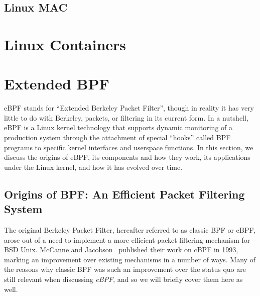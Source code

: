 \subsection{Linux MAC}%
\label{ss:linux-mac-bg}




\section{Linux Containers}%
\label{s:containers-bg}




\section{Extended BPF}%
\label{s:ebpf-bg}

eBPF stands for \enquote{Extended Berkeley Packet Filter}, though in reality it has very
little to do with Berkeley, packets, or filtering in its current form.  In a nutshell,
eBPF is a Linux kernel technology that supports dynamic monitoring of a production system
through the attachment of special \enquote{hooks} called BPF programs to specific kernel
interfaces and userspace functions. In this section, we discuss the origins of eBPF, its
components and how they work, its applications under the Linux kernel, and how it has
evolved over time.

\subsection{Origins of BPF\@: An Efficient Packet Filtering System}%
\label{ss:origins-of-bpf-bg}

The original Berkeley Packet Filter, hereafter referred to as classic BPF or cBPF, arose
out of a need to implement a more efficient packet filtering mechanism for BSD Unix.
McCanne and Jacobson~\cite{mccanne1993_bpf} published their work on cBPF in 1993, marking
an improvement over existing mechanisms in a number of ways. Many of the reasons why
classic BPF was such an improvement over the status quo are still relevant when discussing
\textit{eBPF}, and so we will briefly cover them here as well.

